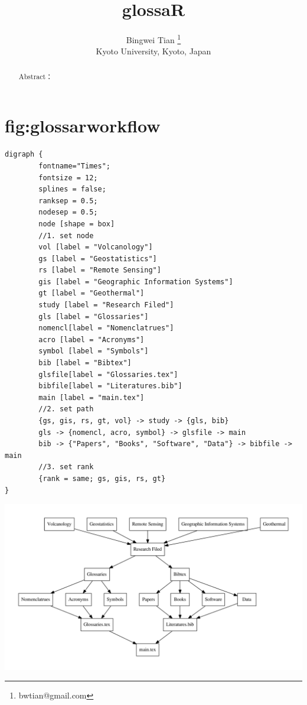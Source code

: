 \documentclass[a4paper,times,12pt,listings-bw,microtype]{article}
\author{Bingwei Tian  \thanks{bwtian@gmail.com}\\  \small{Kyoto University, Kyoto, Japan}}
\date{}
\title{glossaR}
\begin{document}
\maketitle
\setcounter{tocdepth}{2}
\tableofcontents

\label{sec-1}
\begin{abstract}
Abstract：
\end{abstract}


\section{fig:glossarworkflow}
\label{sec-2}
\begin{verbatim}
digraph { 
        fontname="Times"; 
        fontsize = 12; 
        splines = false; 
        ranksep = 0.5; 
        nodesep = 0.5; 
        node [shape = box] 
        //1. set node 
        vol [label = "Volcanology"]
        gs [label = "Geostatistics"]
        rs [label = "Remote Sensing"]
        gis [label = "Geographic Information Systems"]
        gt [label = "Geothermal"]
        study [label = "Research Filed"]
        gls [label = "Glossaries"]
        nomencl[label = "Nomenclatrues"]
        acro [label = "Acronyms"]
        symbol [label = "Symbols"]
        bib [label = "Bibtex"]
        glsfile[label = "Glossaries.tex"]
        bibfile[label = "Literatures.bib"]
        main [label = "main.tex"]
        //2. set path 
        {gs, gis, rs, gt, vol} -> study -> {gls, bib}
        gls -> {nomencl, acro, symbol} -> glsfile -> main
        bib -> {"Papers", "Books", "Software", "Data"} -> bibfile -> main
        //3. set rank 
        {rank = same; gs, gis, rs, gt} 
}
\end{verbatim}

\includegraphics[width=.9\linewidth]{./glossaRWorkflow.pdf}
\end{document}
